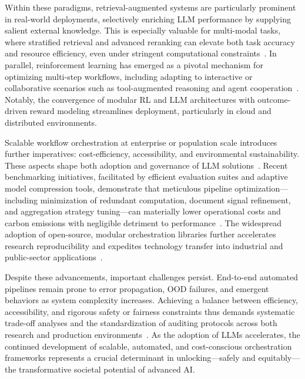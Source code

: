 \documentclass[sigconf]{acmart}
\begin{document}
Within these paradigms, retrieval-augmented systems are particularly prominent in real-world deployments, selectively enriching LLM performance by supplying salient external knowledge. This is especially valuable for multi-modal tasks, where stratified retrieval and advanced reranking can elevate both task accuracy and resource efficiency, even under stringent computational constraints~\cite{ref79,ref80,ref89}. In parallel, reinforcement learning has emerged as a pivotal mechanism for optimizing multi-step workflows, including adapting to interactive or collaborative scenarios such as tool-augmented reasoning and agent cooperation~\cite{ref8,ref9,ref12,ref37,ref55,ref60,ref64,ref86}. Notably, the convergence of modular RL and LLM architectures with outcome-driven reward modeling streamlines deployment, particularly in cloud and distributed environments.

Scalable workflow orchestration at enterprise or population scale introduces further imperatives: cost-efficiency, accessibility, and environmental sustainability. These aspects shape both adoption and governance of LLM solutions~\cite{ref37,ref43,ref55,ref88,ref104}. Recent benchmarking initiatives, facilitated by efficient evaluation suites and adaptive model compression tools, demonstrate that meticulous pipeline optimization—including minimization of redundant computation, document signal refinement, and aggregation strategy tuning—can materially lower operational costs and carbon emissions with negligible detriment to performance~\cite{ref43,ref55,ref88,ref104}. The widespread adoption of open-source, modular orchestration libraries further accelerates research reproducibility and expedites technology transfer into industrial and public-sector applications~\cite{ref37,ref43,ref79,ref86}.

Despite these advancements, important challenges persist. End-to-end automated pipelines remain prone to error propagation, OOD failures, and emergent behaviors as system complexity increases. Achieving a balance between efficiency, accessibility, and rigorous safety or fairness constraints thus demands systematic trade-off analyses and the standardization of auditing protocols across both research and production environments~\cite{ref8,ref43,ref80,ref104}. As the adoption of LLMs accelerates, the continued development of scalable, automated, and cost-conscious orchestration frameworks represents a crucial determinant in unlocking---safely and equitably---the transformative societal potential of advanced AI.
\end{document}
